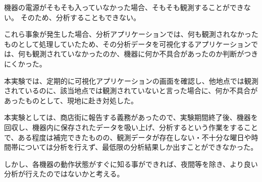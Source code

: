 機器の電源がそもそも入っていなかった場合、そもそも観測することができない。
そのため、分析することもできない。

これら事象が発生した場合、分析アプリケーションでは、何も観測されなかったものとして処理していたため、その分析データを可視化するアプリケーションでは、何も観測されていなかったのか、機器に何か不具合があったのか判断がつきにくかった。

本実験では、定期的に可視化アプリケーションの画面を確認し、他地点では観測されているのに、該当地点では観測されていないと言った場合に、何か不具合があったものとして、現地に赴き対処した。

本実験としては、商店街に報告する義務があったので、実験期間終了後、機器を回収し、機器内に保存されたデータを吸い上げ、分析するという作業をすることで、ある程度は補完できたものの、観測データが存在しない・不十分な曜日や時間帯については分析を行えず、最低限の分析結果しか出すことができなかった。

しかし、各機器の動作状態がすぐに知る事ができれば、夜間等を除き、より良い分析が行えたのではないかと考える。


